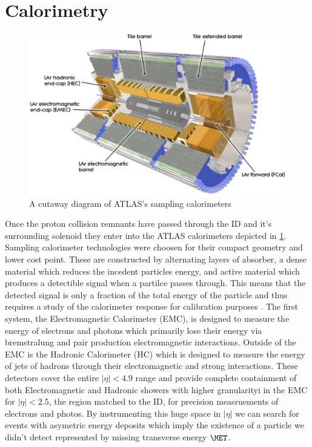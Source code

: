 \section{Calorimetry} \label{sec:atlas:calorimetry}

\begin{figure}[!htbp]
  \begin{center}
    \includegraphics[width=0.8\linewidth]{figures/atlas/calorimeter_cutaway}
    \caption{ \cite{PERF-2007-01} A cutaway diagram of ATLAS's sampling calorimeters}
    \label{fig:calorimeter_cutaway}
  \end{center}
\end{figure}

Once the proton collision remnants have passed through the ID and it's
surrounding solenoid they enter into the ATLAS calorimeters depicted in
\cref{fig:calorimeter_cutaway}.  Sampling calorimeter technologies were choosen
for their compact geometry and lower cost point.  These are constructed by
alternating layers of absorber, a dense material which reduces the incedent
particles energy, and active material which produces a detectible signal when a
partilce passes through.  This means that the detected signal is only a fraction
of the total energy of the particle and thus requires a study of the calorimeter
response for calibration purposes \cite{Fabjan:692252}. The first system, the
Electromagnetic Calorimeter (EMC), is designed to measure the energy of
electrons and photons which primarily lose their energy via bremstralung and
pair production electromagnetic interactions.  Outside of the EMC is the
Hadronic Calorimeter (HC) which is designed to measure the energy of jets of
hadrons through their electromagnetic and strong interactions. These detectors
cover the entire $|\eta| < 4.9$ range and provide complete containment of both
Electromagnetic and Hadronic showers with higher granularityi in the EMC for
$|\eta| < 2.5$, the region matched to the ID, for precision measruements of
electrons and photos.  By instrumenting this huge space in $|\eta|$ we can
search for events with asymetric energy deposits which imply the existence of a
particle we didn't detect represented by missing transverse energy $\MET$.

